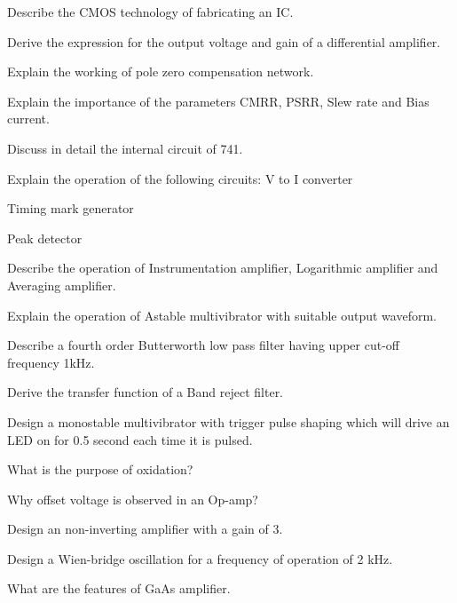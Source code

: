 \markB
\partC

\item Describe the CMOS technology of fabricating an IC. 
\Or 
\item Derive the expression for the output voltage and gain of a differential amplifier. 

\item \iitem Explain the working of pole zero compensation network. 
\item Explain the importance of the parameters CMRR, PSRR, Slew rate and Bias current.

\ene
\Or
\item Discuss in detail the internal circuit of 741.

\newpage

\item Explain the operation of the following circuits:
\iitem V to I converter
\item Timing mark generator
\item Peak detector
\ene
\Or
\item Describe the operation of Instrumentation amplifier, Logarithmic amplifier and Averaging amplifier.

\item \iitem Explain the operation of Astable multivibrator with suitable output waveform.  
\item Describe a fourth order Butterworth low pass filter having upper cut-off frequency 1kHz.

\ene
\Or
\item \iitem Derive the transfer function of a Band reject filter.
\item Design a monostable multivibrator with trigger pulse shaping which will drive an LED on for
      0.5 second each time it is pulsed. \ene

\markC
\ene

\newpage

\sub{\subj}
\maxtime

\partA

\iitem What is the purpose of oxidation?
\item Why offset voltage is observed in an Op-amp?
\item Design an non-inverting amplifier with a gain of 3.
\item Design a Wien-bridge oscillation for a frequency of operation of 2 kHz.
\item What are the features of GaAs amplifier.

